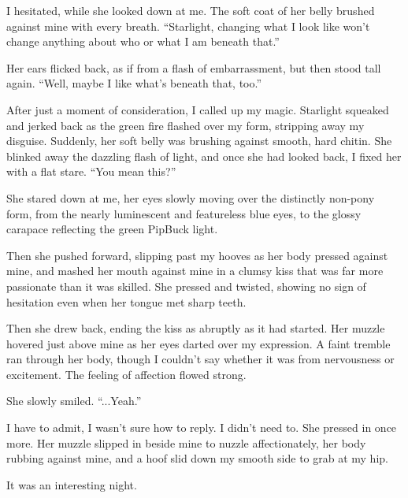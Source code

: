 I hesitated, while she looked down at me. The soft coat of her belly brushed against mine with every breath. “Starlight, changing what I look like won’t change anything about who or what I am beneath that.”

Her ears flicked back, as if from a flash of embarrassment, but then stood tall again. “Well, maybe I like what’s beneath that, too.”

After just a moment of consideration, I called up my magic. Starlight squeaked and jerked back as the green fire flashed over my form, stripping away my disguise. Suddenly, her soft belly was brushing against smooth, hard chitin. She blinked away the dazzling flash of light, and once she had looked back, I fixed her with a flat stare. “You mean this?”

She stared down at me, her eyes slowly moving over the distinctly non-pony form, from the nearly luminescent and featureless blue eyes, to the glossy carapace reflecting the green PipBuck light.

Then she pushed forward, slipping past my hooves as her body pressed against mine, and mashed her mouth against mine in a clumsy kiss that was far more passionate than it was skilled. She pressed and twisted, showing no sign of hesitation even when her tongue met sharp teeth.

Then she drew back, ending the kiss as abruptly as it had started. Her muzzle hovered just above mine as her eyes darted over my expression. A faint tremble ran through her body, though I couldn’t say whether it was from nervousness or excitement. The feeling of affection flowed strong.

She slowly smiled. “...Yeah.”

I have to admit, I wasn’t sure how to reply. I didn’t need to. She pressed in once more. Her muzzle slipped in beside mine to nuzzle affectionately, her body rubbing against mine, and a hoof slid down my smooth side to grab at my hip.

It was an interesting night.